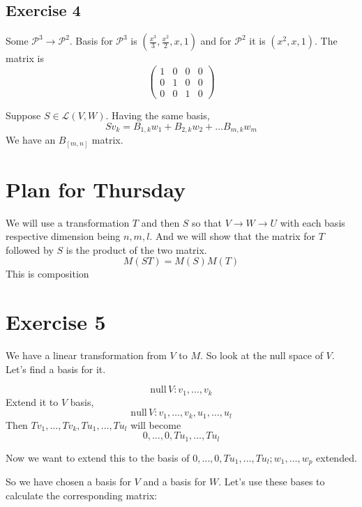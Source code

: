 \documentclass[letter]{article}
\begin{document}
\subsection*{Exercise 4 } 
Some $\mathcal P ^3 \to  \mathcal P ^2$. Basis for $\mathcal P^3$ is $\left(\frac{x^3}{3}, \frac{x^2}{2}, x ,1\right)$ and for $\mathcal P^2$  it is $(x^2,x,1)$. The matrix is 
\[
	\begin{pmatrix} 1 & 0 & 0 & 0 \\ 0 & 1 & 0 & 0 \\ 0 & 0 & 1 & 0 \end{pmatrix} 
\]

Suppose $S \in \mathcal L (V,W)$. Having the same basis, 
\[
	S v_k = B_{1,k} w_1 + B_{2, k} w_2 + \ldots B_{m,k} w_m
\]
We have an $B_{[m,n]}$ matrix. 

\section*{Plan for Thursday}
We will use a transformation $T$ and then $S$ so that $V \to  W \to U$ with each basis respective dimension being $n, m , l$. And we will show that the matrix for $T$ followed by $S$ is the product of the two matrix. 
\[
M(ST) = M (S) M (T)
\] 
This is composition

\section*{Exercise 5} 
We have a linear transformation from $V$ to $M$. So look at the null space of $V$. Let's find a basis for it. 

\[
\text{null} \, V : v_1, \ldots, v_k
\] 
Extend it to $V$ basis, 
\[
\text{null} \, V : v_1, \ldots, v_k, u_1, \ldots, u_l 
\]
Then $T v_1, \ldots, T v_k, T u_1, \ldots, T u_l$ will become
\[
0, \ldots, 0, T u_1 , \ldots, T u_l 
\] 

Now we want to extend this to the basis of 
$
0, \ldots, 0, T u_1 , \ldots, T u_l ; w_1, \ldots , w_p $ extended. 

So we have chosen a basis for $V$ and a basis for $W$. Let's use these bases to calculate the corresponding matrix: 
\end{document}
